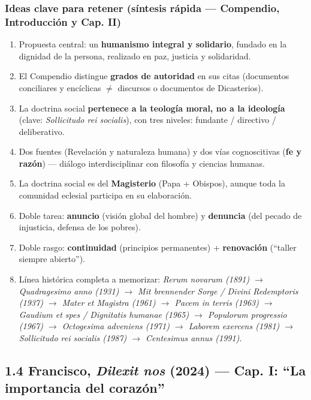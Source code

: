 \documentclass[10pt,a4paper]{article}
\begin{document}
\subsubsection{Ideas clave para retener (síntesis rápida --- Compendio, Introducción y Cap. II)}
\begin{enumerate}
\item Propuesta central: un \textbf{humanismo integral y solidario}, fundado en la dignidad de la persona, realizado en paz, justicia y solidaridad.
\item El Compendio distingue \textbf{grados de autoridad} en sus citas (documentos conciliares y encíclicas $\neq$ discursos o documentos de Dicasterios).
\item La doctrina social \textbf{pertenece a la teología moral, no a la ideología} (clave: \textit{Sollicitudo rei socialis}), con tres niveles: fundante / directivo / deliberativo.
\item Dos fuentes (Revelación y naturaleza humana) y dos vías cognoscitivas (\textbf{fe y razón}) --- diálogo interdisciplinar con filosofía y ciencias humanas.
\item La doctrina social es del \textbf{Magisterio} (Papa + Obispos), aunque toda la comunidad eclesial participa en su elaboración.
\item Doble tarea: \textbf{anuncio} (visión global del hombre) y \textbf{denuncia} (del pecado de injusticia, defensa de los pobres).
\item Doble rasgo: \textbf{continuidad} (principios permanentes) + \textbf{renovación} (``taller siempre abierto'').
\item Línea histórica completa a memorizar: \textit{Rerum novarum (1891) $\rightarrow$ Quadragesimo anno (1931) $\rightarrow$ Mit brennender Sorge / Divini Redemptoris (1937) $\rightarrow$ Mater et Magistra (1961) $\rightarrow$ Pacem in terris (1963) $\rightarrow$ Gaudium et spes / Dignitatis humanae (1965) $\rightarrow$ Populorum progressio (1967) $\rightarrow$ Octogesima adveniens (1971) $\rightarrow$ Laborem exercens (1981) $\rightarrow$ Sollicitudo rei socialis (1987) $\rightarrow$ Centesimus annus (1991)}.
\end{enumerate}



\subsection{1.4 Francisco, \textit{Dilexit nos} (2024) --- Cap. I: ``La importancia del corazón''}
\end{document}
